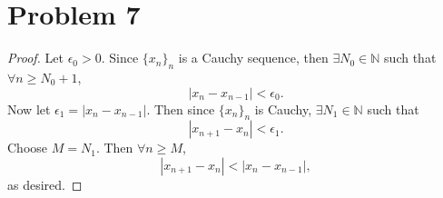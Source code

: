 \documentclass{article}
\begin{document}
\section*{Problem 7}
\begin{proof}
	Let $\epsilon_0 > 0$. Since $\{x_n\}_n$ is a Cauchy sequence, then $\exists N_0 \in \mathbb{N}$ such that $\forall n\geq N_0 + 1$,
	\begin{equation}
		|x_n - x_{n-1}| < \epsilon_0.
	\end{equation}
	Now let $\epsilon_1 = |x_n - x_{n-1}|$. Then since $\{x_n\}_n$ is Cauchy, $\exists N_1 \in \mathbb{N}$ such that
	\begin{equation}
		|x_{n+1}-x_n| < \epsilon_1.
	\end{equation} 
	Choose $M=N_1$. Then $\forall n \geq M$, 
	\begin{equation}
		|x_{n+1}-x_n| < |x_n - x_{n-1}|,
	\end{equation}
	as desired.
\end{proof}
\end{document}

